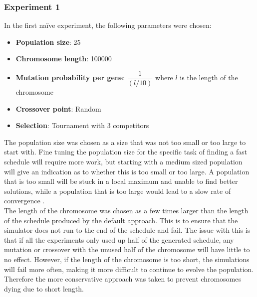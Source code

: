 \documentclass{article}
\newcommand{\n}[0]{\\[\baselineskip]}
\begin{document}
\subsubsection{Experiment 1}
In the first na\"{i}ve experiment, the following parameters were chosen:
\begin{itemize}
\item \textbf{Population size}: 25
\item \textbf{Chromosome length}: 100000
\item \textbf{Mutation probability per gene}: $\dfrac{1}{(l/10)}$ where $l$ is the length of the chromosome
\item \textbf{Crossover point}: Random
\item \textbf{Selection}: Tournament with 3 competitors
\end{itemize}
The population size was chosen as a size that was not too small or too large to start with. Fine tuning the population size for the specific task of finding a fast schedule will require more work, but starting with a medium sized population will give an indication as to whether this is too small or too large. A population that is too small will be stuck in a local maximum and unable to find better solutions, while a population that is too large would lead to a slow rate of convergence \cite{ga-size}.
\n
The length of the chromosome was chosen as a few times larger than the length of the schedule produced by the default approach. This is to ensure that the simulator does not run to the end of the schedule and fail. The issue with this is that if all the experiments only used up half of the generated schedule, any mutation or crossover with the unused half of the chromosome will have little to no effect. However, if the length of the chromosome is too short, the simulations will fail more often, making it more difficult to continue to evolve the population. Therefore the more conservative approach was taken to prevent chromosomes dying due to short length.
\end{document}

